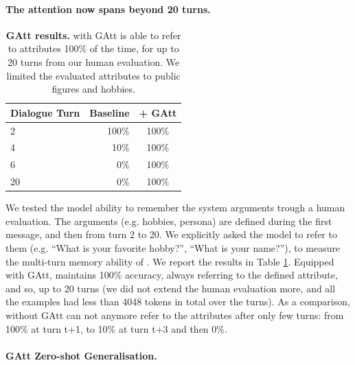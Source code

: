 \paragraph{The attention now spans beyond 20 turns.}
\begin{table}[htbp]
\centering
\begin{tabular}{l|rc}
\textbf{Dialogue   Turn} & \textbf{Baseline} & \textbf{+ GAtt } \\
\toprule
2                        & 100\%             & 100\%          \\
4                        & 10\%              & 100\%          \\
6                        & 0\%               & 100\%          \\
20                       & 0\%               & 100\%     \\
\bottomrule
\end{tabular}
\caption{\textbf{GAtt results.} \modelname with GAtt  is able to refer to attributes 100\% of the time, for up to 20 turns from our human evaluation. We limited the evaluated attributes to public figures and hobbies.}
\label{tab:GAtt_eval_20_turns}
\end{table}

We tested the model ability to remember the system arguments trough a human evaluation. The arguments (e.g. hobbies, persona) are defined during the first message, and then from turn 2 to 20. We explicitly asked the model to refer to them (e.g. ``What is your favorite hobby?'', ``What is your name?''), to measure the multi-turn memory ability of \modelname. We report the results in Table \ref{tab:GAtt_eval_20_turns}. Equipped with GAtt, \modelname maintains 100\% accuracy, always referring to the defined attribute, and so, up to 20 turns (we did not extend the human evaluation more, and all the examples had less than 4048 tokens in total over the turns). As a comparison, \modelname without GAtt can not anymore refer to the attributes after only few turns: from 100\% at turn t+1, to 10\% at turn t+3 and then 0\%.

\paragraph{GAtt Zero-shot Generalisation.}


